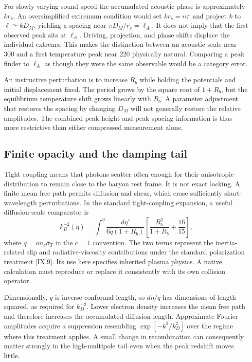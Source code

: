 For slowly varying sound speed the accumulated acoustic phase is approximately $kr_s$. An oversimplified extremum condition would set $kr_s=n\pi$ and project $k$ to $\ell\simeq kD_M$, yielding a spacing near $\pi D_M/r_s=\ell_A$. It does not imply that the first observed peak sits at $\ell_A$. Driving, projection, and phase shifts displace the individual extrema. This makes the distinction between an acoustic scale near 300 and a first temperature peak near 220 physically natural. Comparing a peak finder to $\ell_A$ as though they were the same observable would be a category error.

An instructive perturbation is to increase $R_b$ while holding the potentials and initial displacement fixed. The period grows by the square root of $1+R_b$, but the equilibrium temperature shift grows linearly with $R_b$. A parameter adjustment that restores the spacing by changing $D_M$ will not generally restore the relative amplitudes. The combined peak-height and peak-spacing information is thus more restrictive than either compressed measurement alone.

\subsection{Finite opacity and the damping tail}

Tight coupling means that photons scatter often enough for their anisotropic distribution to remain close to the baryon rest frame. It is not exact locking. A finite mean free path permits diffusion and shear, which erase sufficiently short-wavelength perturbations. In the standard tight-coupling expansion, a useful diffusion-scale comparator is
\begin{equation}
 k_D^{-2}(\eta)=\int^{\eta}\frac{d\eta'}{6q(1+R_b)}
 \left[\frac{R_b^2}{1+R_b}+\frac{16}{15}\right],
 \label{c9:diffusion}
\end{equation}
where $q=a n_e\sigma_T$ in the $c=1$ convention. The two terms represent the inertia-related slip and radiative-viscosity contributions under the standard polarization treatment [IX.9]. Its use here specifies inherited plasma physics. A native calculation must reproduce or replace it consistently with its own collision operator.

Dimensionally, $q$ is inverse conformal length, so $d\eta/q$ has dimensions of length squared, as required for $k_D^{-2}$. Lower electron density increases the mean free path and therefore increases the accumulated diffusion length. Approximate Fourier amplitudes acquire a suppression resembling $\exp[-k^2/k_D^2]$ over the regime where this treatment applies. A small change in recombination can consequently matter strongly in the high-multipole tail even when the peak redshift moves little.

